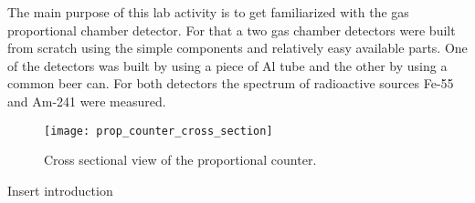 
The main purpose of this lab activity is to get familiarized with the gas proportional chamber detector. For that a two gas chamber detectors were built 
from scratch using the simple components and relatively easy available parts. One of the detectors was built by using a piece of Al tube and the other by using a common beer can. 
For both detectors the spectrum of radioactive sources Fe-55 and Am-241 were measured. 

\begin{figure}[!h]
  \centering
  \texttt{[image: prop\_counter\_cross\_section]}
  \caption{Cross sectional view of the proportional counter\autocite{Knoll:RadMeasurement}.}
  \label{fig:prop_count_cs}
\end{figure}
Insert introduction
